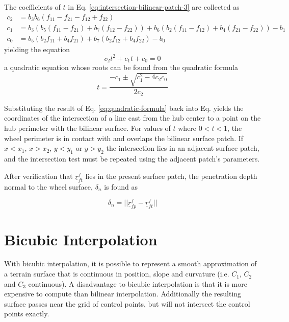 \documentclass[
10pt, %
a4paper, %
oneside, %
headinclude,footinclude, %
BCOR5mm, %
]{scrartcl}
\begin{document}
The coefficients of $t$ in Eq. \eqref{eq:intersection-bilinear-patch-3} are collected as
\begin{equation}
\begin{split}
  c_2 &= b_3 b_6 (f_{11} - f_{21} - f_{12} + f_{22})\\
  c_1 &= b_3 (b_5 (f_{11} - f_{21}) + b_7(f_{12} - f_{22})) + b_6 ( b_2 (f_{11} - f_{12}) + b_4 (f_{21} - f_{22})) - b_1\\
  c_0 &= b_5 (b_2 f_{11} + b_4 f_{21}) + b_7 (b_2 f_{12} + b_4 f_{22}) - b_0
\end{split}
\end{equation}
yielding the equation
\begin{equation}
c_2 t^2 + c_1 t + c_0 = 0
\end{equation}
a quadratic equation whose roots can be found from the quadratic formula
\begin{equation}
  \label{eq:quadratic-formula}
  t = \frac{-c_1 \pm \sqrt{c_1^2 - 4 c_2 c_0}}{2c_2}
\end{equation}

Substituting the result of Eq. \eqref{eq:quadratic-formula} back into Eq.   \label{eq:parametric-eqn-line} yields the coordinates of the intersection of a line cast from the hub center to a point on the hub perimeter with the bilinear surface. For values of $t$ where $0 < t < 1$, the wheel perimeter is in contact with and overlaps the bilinear surface patch. If $x < x_1$, $x > x_2$, $y < y_1$ or $y > y_2$ the intersection lies in an adjacent surface patch, and the intersection test must be repeated using the adjacent patch's parameters.

After verification that $\underline{r}_{ft}^f$ lies in the present surface patch, the penetration depth normal to the wheel surface, $\delta_n$ is found as

\begin{equation}
\delta_n = \lvert \lvert \underline{r}_{fp}^f - \underline{r}_{ft}^f \rvert \rvert
\end{equation}


\section{Bicubic Interpolation}
With bicubic interpolation, it is possible to represent a smooth approximation of a terrain surface that is continuous in position, slope and curvature (i.e. $C_1$, $C_2$ and $C_3$ continuous). A disadvantage to bicubic interpolation is that it is more expensive to compute than bilinear interpolation. Additionally the resulting surface passes near the grid of control points, but will not intersect the control points exactly.
\end{document}
